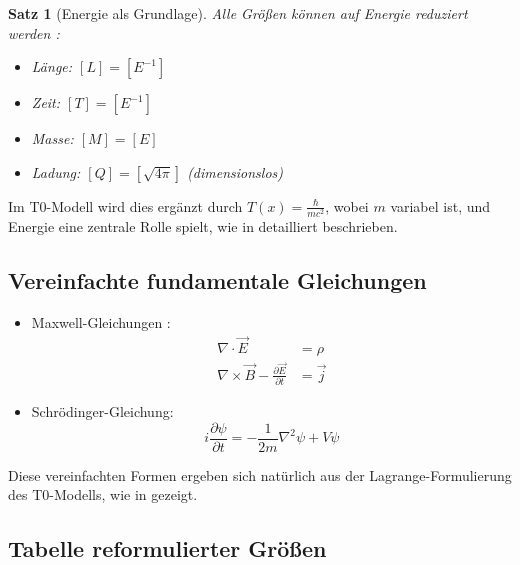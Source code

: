 \documentclass[12pt,a4paper]{article}
\newcommand{\Tfield}{T(x)}
\newtheorem{theorem}{Satz}[section]
\begin{document}
	\begin{theorem}[Energie als Grundlage]
		Alle Größen können auf Energie reduziert werden \cite{Duff2002}:
		\begin{itemize}
			\item Länge: \([L] = [E^{-1}]\)
			\item Zeit: \([T] = [E^{-1}]\)
			\item Masse: \([M] = [E]\)
			\item Ladung: \([Q] = [\sqrt{4\pi}]\) (dimensionslos)
		\end{itemize}
	\end{theorem}
	
	Im T0-Modell wird dies ergänzt durch \(\Tfield = \frac{\hbar}{m c^2}\), wobei \(m\) variabel ist, und Energie eine zentrale Rolle spielt, wie in \cite{pascher_zeit_masse_2025} detailliert beschrieben.
	
	\subsection{Vereinfachte fundamentale Gleichungen}
	\label{subsec:simplified_equations}
	
	\begin{itemize}
		\item Maxwell-Gleichungen \cite{Feynman1985}:
		\begin{align}
			\nabla \cdot \vec{E} &= \rho \\
			\nabla \times \vec{B} - \frac{\partial \vec{E}}{\partial t} &= \vec{j}
		\end{align}
		\item Schrödinger-Gleichung:
		\begin{equation}
			i \frac{\partial \psi}{\partial t} = -\frac{1}{2m} \nabla^2 \psi + V \psi
		\end{equation}
	\end{itemize}
	
	Diese vereinfachten Formen ergeben sich natürlich aus der Lagrange-Formulierung des T0-Modells, wie in \cite{pascher_lagrange_2025} gezeigt.
	
	\subsection{Tabelle reformulierter Größen}
	\label{subsec:reformulated_quantities}
	
\end{document}
